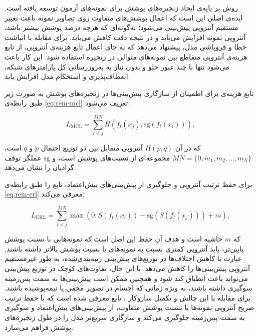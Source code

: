 
روش  بر پایه‌ی ایجاد زنجیره‌های پوشش برای نمونه‌های آزمون توسعه یافته است. ایده‌ی اصلی این است که اعمال پوشش‌های متفاوت روی تصاویر نمونه باعث تغییر مستقیم آنتروپی پیش‌بینی می‌شود؛ به‌گونه‌ای که هرچه درصد پوشش بیشتر باشد، آنتروپی نمونه افزایش می‌یابد و در نتیجه دقت کاهش می‌یابد. برای مقابله با انباشت خطا و فروپاشی مدل،  پیشنهاد می‌دهد که به جای اعمال تابع هزینه‌ی آنتروپی، از تابع هزینه‌ی آنتروپی متقاطع بین نمونه‌های متوالی در زنجیره استفاده شود. این کار باعث می‌شود تنها با چند {عبور جلو} و بدون نیاز به به‌روزرسانی کل پارامترهای شبکه، انعطاف‌پذیری و استحکام مدل افزایش یابد.  

تابع هزینه‌ی  برای اطمینان از سازگاری پیش‌بینی‌ها در زنجیره‌های پوشش به صورت زیر طبق رابطه‌ی \ref{eq:rem-mcl} تعریف می‌شود\cite{rem}:  

\begin{equation}
	L_{\text{MCL}} = \sum_{i<j}^{MN} H(f_t(x_j), \text{sg}(f_t(x_i))),
	\label{eq:rem-mcl}
\end{equation}

که در آن \(H(p, q)\) آنتروپی متقابل بین دو توزیع احتمال \(p\) و \(q\) است، \(MN = \{0, m_1, m_2, \dots, m_N\}\) مجموعه‌ای از نسبت‌های پوشش است، و \(\text{sg}\) عملگر توقف گرادیان را نشان می‌دهد.  

برای حفظ ترتیب آنتروپی و جلوگیری از پیش‌بینی‌های بیش‌اعتماد،  تابع  را طبق رابطه‌ی \ref{eq:rem-erl} معرفی می‌کند\cite{rem}:  

\begin{equation}
	L_{\text{ERL}} = \sum_{i<j}^{MN} \max(0, S(f_t(x_i)) - \text{sg}(S(f_t(x_j))) + m),
	\label{eq:rem-erl}
\end{equation}

که \(m\) {حاشیه} است و هدف آن حفظ این اصل است که نمونه‌هایی با نسبت پوشش پایین‌تر، باید آنتروپی کمتری نسبت به نمونه‌های با نسبت پوشش بالاتر داشته باشند.
عبارت  با کاهش اختلاف‌ها در توزیع‌های پیش‌بینی رتبه‌بندی‌شده، به طور غیرمستقیم آنتروپی پیش‌بینی‌ها را کاهش می‌دهد. با این حال، تفاوت‌های کوچک در توزیع پیش‌بینی می‌تواند باعث انطباق کند شود و همچنین ممکن است پیش‌بینی‌ها به سمت پس‌زمینه سوگیری داشته باشند، به ویژه زمانی که اجسام در تصویر مخفی یا نیمه‌پوشیده باشند. برای مقابله با این چالش و تکمیل سازوکار ، تابع  معرفی شده است که با حفظ ترتیب صریح آنتروپی نمونه‌ها با نسبت پوشش متفاوت، از پیش‌بینی‌های بیش‌اعتماد و سوگیری به سمت پس‌زمینه جلوگیری می‌کند و سازگاری سریع‌تر مدل را در طول زنجیره‌های پوشش فراهم می‌سازد.

